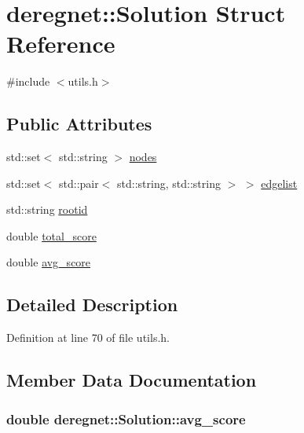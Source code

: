 \hypertarget{structderegnet_1_1Solution}{}\section{deregnet\+:\+:Solution Struct Reference}
\label{structderegnet_1_1Solution}


{\ttfamily \#include $<$utils.\+h$>$}

\subsection*{Public Attributes}
\begin{DoxyCompactItemize}
\item 
std\+::set$<$ std\+::string $>$ \hyperlink{structderegnet_1_1Solution_a581de4de354d10149c7b9c0816c70840}{nodes}
\item 
std\+::set$<$ std\+::pair$<$ std\+::string, std\+::string $>$ $>$ \hyperlink{structderegnet_1_1Solution_aa4dcc94d51fa7e4e9443263572d8b18d}{edgelist}
\item 
std\+::string \hyperlink{structderegnet_1_1Solution_a1aca697c0ec5e039837094cb45731215}{rootid}
\item 
double \hyperlink{structderegnet_1_1Solution_af2e4901767f70d22b41acafa8cfb62d2}{total\+\_\+score}
\item 
double \hyperlink{structderegnet_1_1Solution_a9282be3934d49183f8b5304130ee07c7}{avg\+\_\+score}
\end{DoxyCompactItemize}


\subsection{Detailed Description}


Definition at line 70 of file utils.\+h.



\subsection{Member Data Documentation}
\subsubsection[{\texorpdfstring{avg\+\_\+score}{avg_score}}]{\setlength{\rightskip}{0pt plus 5cm}double deregnet\+::\+Solution\+::avg\+\_\+score}\hypertarget{structderegnet_1_1Solution_a9282be3934d49183f8b5304130ee07c7}{}\label{structderegnet_1_1Solution_a9282be3934d49183f8b5304130ee07c7}


